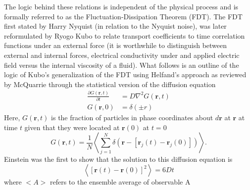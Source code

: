 The logic behind these relations is independent of the physical process and is formally referred to as the Fluctuation-Dissipation Theorem (FDT). The FDT first stated by Harry Nyquist (in relation to the Nyquist noise), was later reformulated by Ryogo Kubo to relate transport coefficients to time correlation functions \cite{JPSJ.12.570} under an external force (it is worthwhile to distinguish between external and internal forces, electrical conductivity under and applied electric field versus the internal viscosity of a fluid)\cite{zwanzig1965time}. What follows is an outline of the logic of Kubo's generalization of the FDT using Helfand's approach as reviewed by McQuarrie\cite{mcquarrie} through the statistical version of the diffusion equation
%
\begin{equation}
\begin{split}
	\frac{\partial G(\bm{r},t)}{\partial t}&= D \nabla ^2G(\bm{r},t)\\
G(\bm{r},0)&=\delta(\pm{r})
\end{split}
\end{equation}
%
Here, $G(\bm{r},t)$ is the fraction of particles in phase coordinates about $d\bm{r}$ at $\bm{r}$ at time $t$ given that they were located at $\bm{r}(0)$ at $t=0$
%
\begin{equation}
G(\bm{r},t)= \frac{1}{N}\left<\sum_{j=1}^N\delta(\bm{r}-[\bm{r}_j(t)-\bm{r}_j(0)])\right>.
\end{equation}
%
Einstein was the first to show that the solution to this diffusion equation is \cite{}
%
\begin{equation} \label{EQ:Einstein}
\left<[\bm{r}(t)-\bm{r}(0)]^2\right>=6Dt
\end{equation}
%
%
%
where $<A>$ refers to the ensemble average of observable A
